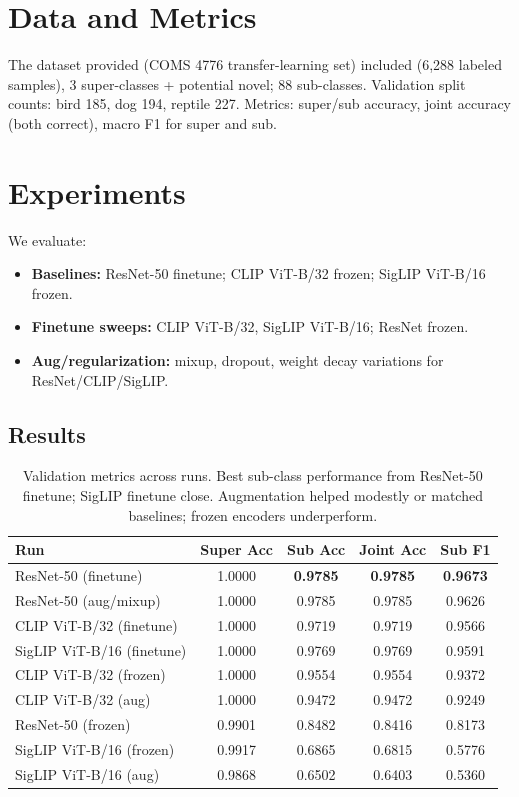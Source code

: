 \documentclass{article}
\begin{document}
\section{Data and Metrics}
The dataset provided (COMS 4776 transfer-learning set) included (6{,}288 labeled samples), 3 super-classes + potential novel; 88 sub-classes. Validation split counts: bird 185, dog 194, reptile 227. Metrics: super/sub accuracy, joint accuracy (both correct), macro F1 for super and sub.

\section{Experiments}
We evaluate:
\begin{itemize}
    \item \textbf{Baselines:} ResNet-50 finetune; CLIP ViT-B/32 frozen; SigLIP ViT-B/16 frozen.
    \item \textbf{Finetune sweeps:} CLIP ViT-B/32, SigLIP ViT-B/16; ResNet frozen.
    \item \textbf{Aug/regularization:} mixup, dropout, weight decay variations for ResNet/CLIP/SigLIP.
\end{itemize}

\subsection{Results}
\begin{table}[h]
\centering
\begin{tabular}{lcccc}
\toprule
Run & Super Acc & Sub Acc & Joint Acc & Sub F1 \\
\midrule
ResNet-50 (finetune) & 1.0000 & \textbf{0.9785} & \textbf{0.9785} & \textbf{0.9673} \\
ResNet-50 (aug/mixup) & 1.0000 & 0.9785 & 0.9785 & 0.9626 \\
CLIP ViT-B/32 (finetune) & 1.0000 & 0.9719 & 0.9719 & 0.9566 \\
SigLIP ViT-B/16 (finetune) & 1.0000 & 0.9769 & 0.9769 & 0.9591 \\
CLIP ViT-B/32 (frozen) & 1.0000 & 0.9554 & 0.9554 & 0.9372 \\
CLIP ViT-B/32 (aug) & 1.0000 & 0.9472 & 0.9472 & 0.9249 \\
ResNet-50 (frozen) & 0.9901 & 0.8482 & 0.8416 & 0.8173 \\
SigLIP ViT-B/16 (frozen) & 0.9917 & 0.6865 & 0.6815 & 0.5776 \\
SigLIP ViT-B/16 (aug) & 0.9868 & 0.6502 & 0.6403 & 0.5360 \\
\bottomrule
\end{tabular}
\caption{Validation metrics across runs. Best sub-class performance from ResNet-50 finetune; SigLIP finetune close. Augmentation helped modestly or matched baselines; frozen encoders underperform.}
\end{table}
\end{document}
